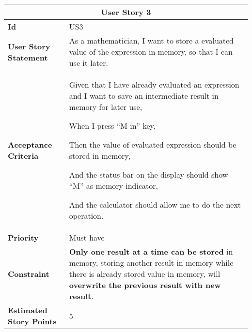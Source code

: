 \hspace{1cm}
\begin{center}
\begin{tabular}{ | m{2.3cm} | m{12cm} | } 

 \hline
 \multicolumn{2}{|c|}{\textbf{User Story 3}} \\

\hline
\textbf{Id} & US3 \\ 

\hline
\textbf{User Story Statement} &  As a mathematician, I want to store a evaluated value of the expression in memory, so that I can use it later.\\

\hline
\textbf{Acceptance Criteria} & Given that I have already evaluated an expression and I want to save an intermediate result in memory for later use,

When I press ``M in'' key,

Then the value of evaluated expression should be stored in memory,

And the status bar on the display should show ``M'' as memory indicator,

And the calculator should allow me to do the next operation.\\ 

\hline
\textbf{Priority} & Must have \\ 

\hline
\textbf{Constraint} & \textbf{Only one result at a time can be stored} in memory, storing another result in memory while there is already stored value in memory, will \textbf{overwrite the previous result with new result}.\\ 

\hline
\textbf{Estimated Story Points} & 5 \\ 
\hline

\end{tabular}
\end{center}

